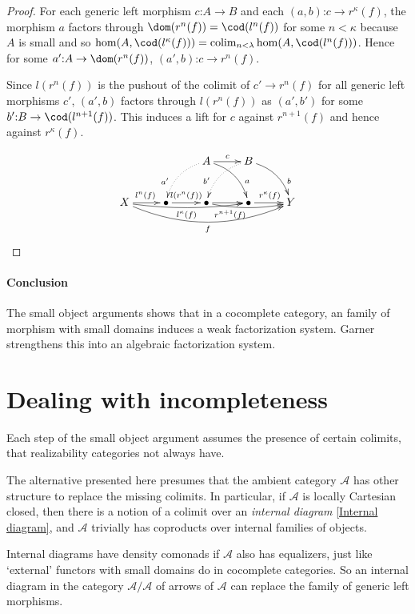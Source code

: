 \documentclass{tac}
\newcommand\cat\mathcal
\newcommand\of{\mathord:}
\newcommand\colim{\mathop{\mathrm{colim}}}
\begin{document}
\begin{proof}
For each generic left morphism $c\of A \to B$ and each $(a,b)\of c\to r^\kappa(f)$, the morphism $a$ factors through $\dom(r^n(f)) = \cod(l^n(f))$ for some $n<\kappa$ because $A$ is small and so $\hom(A,\cod(l^\kappa(f))) =\colim_{n<\lambda} \hom(A,\cod(l^n(f)))$.
Hence for some $a'\of A\to \dom(r^n(f))$, $(a',b)\of c\to r^n(f)$.

Since $l(r^n(f))$ is the pushout of the colimit of $c'\to r^n(f)$ for all generic left morphisms $c'$, $(a',b)$ factors through $l(r^n(f))$ as $(a',b')$ for some $b'\of B \to \cod(l^{n+1}(f))$. This induces a lift for $c$ against $r^{n+1}(f)$ and hence against $r^\kappa(f)$.

\[\xymatrix{
&& A\ar[r]^{c}\ar@/^2ex/[dr]^(.7)a\ar@{.>}@/_2ex/[dl]_(.7){a'} & B\ar@/^2ex/[dr]^(.7)b\ar@{.>}@/_2ex/[dl]_(.7){b'} \\
X \ar[r]^{l^n(f)} \ar@/_1ex/[rrr]_{l^{\kappa}(f)} \ar@/_4ex/[rrrr]_{f} & \bullet \ar[r]^{l(r^n(f))}  & \bullet \ar[r]\ar@/_1ex/[rr]_(.3){r^{n+1}(f)} & \bullet \ar[r]^{r^\kappa(f)} & Y
}\]
\end{proof}

\paragraph{Conclusion}
The small object arguments shows that in a cocomplete category, an family of morphism with small domains induces a weak factorization system. Garner %
strengthens this into an algebraic factorization system.

\section{Dealing with incompleteness}
Each step of the small object argument assumes the presence of certain colimits, that realizability categories not always have.

The alternative presented here presumes that the ambient category $\cat A$ has other structure to replace the missing colimits. In particular, if $\cat A$ is locally Cartesian closed, then there is a notion of a colimit over an \emph{internal diagram} \ref{Internal diagram}, and $\cat A$ trivially has coproducts over internal families of objects.

Internal diagrams have density comonads if $\cat A$ also has equalizers, just like `external' functors with small domains do in cocomplete categories. So an internal diagram in the category $\cat A/\cat A$ of arrows of $\cat A$ can replace the family of generic left morphisms.
\end{document}
